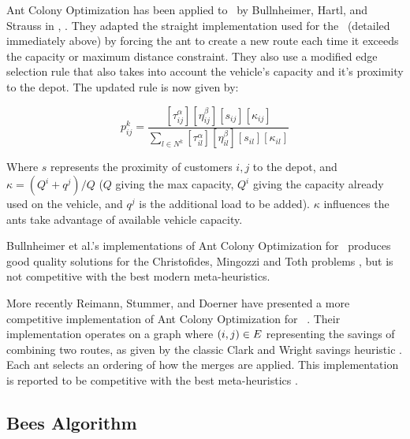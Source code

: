  
Ant Colony Optimization has been applied to \VRP\ by Bullnheimer, Hartl, and Strauss in \cite{BHS:1999A}, \cite{BHS:1999B}. They adapted the straight implementation used for the \TSP\ (detailed immediately above) by forcing the ant to create a new route each time it exceeds the capacity or maximum distance constraint. They also use a modified edge selection rule that also takes into account the vehicle's capacity and it's proximity to the depot. The updated rule is now given by:

\[
   p_{ij}^k = \frac{ [\tau_{ij}^{\alpha}] [\eta_{ij}^{\beta}] [s_{ij}] [\kappa_{ij}]  }{ \sum_{l \in N^k} [\tau_{il}^{\alpha}] [\eta_{il}^{\beta}] [s_{il}] [\kappa_{il}] }
\]

Where $s$ represents the proximity of customers $i, j$ to the depot, and $\kappa = (Q^i + q^j) / Q$ ($Q$ giving the max capacity, $Q^i$ giving the capacity already used on the vehicle, and $q^j$ is the additional load to be added). $\kappa$ influences the ants take advantage of available vehicle capacity. 

Bullnheimer et al.'s implementations of Ant Colony Optimization for \VRP\ produces good quality solutions for the Christofides, Mingozzi and Toth problems \cite{CMT:1981}, but is not competitive with the best modern meta-heuristics.

More recently Reimann, Stummer, and Doerner have presented a more competitive implementation of Ant Colony Optimization for \VRP\ \cite{RSD:2002}. Their implementation operates on a graph where $(i,j) \in E$ representing the savings of combining two routes, as given by the classic Clark and Wright savings heuristic \cite{clark:1964}. Each ant selects an ordering of how the merges are applied. This implementation is reported to be competitive with the best meta-heuristics \cite{Potvin:2009}.   
 
% 
% 

\subsection{Bees Algorithm}
\label{subsec:beesalgorithm}

